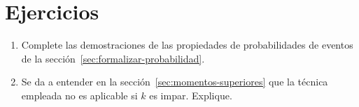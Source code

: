 \section*{Ejercicios}
\label{sec:ejercicios-27previa}

  \begin{enumerate}
  \item
    Complete las demostraciones de las propiedades de probabilidades de eventos
    de la sección~\ref{sec:formalizar-probabilidad}.
  \item
    Se da a entender en la sección~\ref{sec:momentos-superiores}
    que la técnica empleada no es aplicable si \(k\) es impar.
    Explique.
  \end{enumerate}




